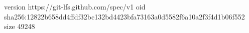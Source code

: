 version https://git-lfs.github.com/spec/v1
oid sha256:12822b658dd4ffdf32bc132bd4423bfa73163a0d5582f6a10a2f3f4d1b06f552
size 49248
